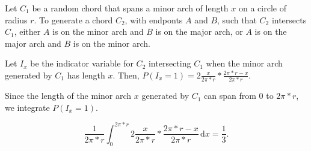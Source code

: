 Let $C_{1}$ be a random chord that spans a minor arch of length $x$ on a circle
of radius $r$. To generate a chord $C_{2}$, with endponts $A$ and $B$, such that
$C_{2}$ intersects $C_{1}$, either $A$ is on the minor arch and $B$ is on the
major arch, or $A$ is on the major arch and $B$ is on the minor arch.

Let $I_{x}$ be the indicator variable for $C_{2}$ intersecting $C_{1}$ when the
minor arch generated by $C_{1}$ has length $x$.
Then, $P(I_{x}=1) = 2\frac{x}{2\pi*r} * \frac{2\pi*r - x}{2\pi*r}$. 

Since the length
of the minor arch $x$ generated by $C_{1}$ can span from $0$ to $2\pi*r$,
we integrate $P(I_{x}=1)$.

$$\frac{1}{2\pi*r} \int_{0}^{2\pi*r} \! 2\frac{x}{2\pi*r} * \frac{2\pi*r - x}
{2\pi*r} \, \mathrm{d}x  = \frac{1}{3}.$$
